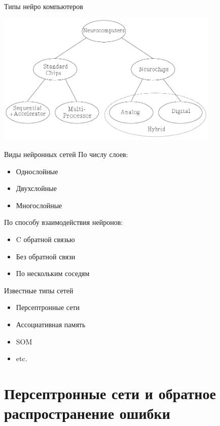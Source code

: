 \documentclass[14pt, fleqn, xcolor={dvipsnames, table}]{beamer}
\begin{document}
\begin{frame}{Типы нейро компьютеров}
\begin{center}
\includegraphics[width=0.8\textwidth]{neurocomp-types}
\end{center}
\end{frame}

\begin{frame}{Виды нейронных сетей}
По числу слоев:
\begin{itemize}
  \item Однослойные 
  \item Двухслойные
  \item Многослойные
\end{itemize}

По способу взаимодействия нейронов:
\begin{itemize}
  \item C обратной связью
  \item Без обратной связи
  \item По нескольким соседям
\end{itemize}
\end{frame}

\begin{frame}{Известные типы сетей}
\begin{itemize}
  \item Персептронные сети
  \item Ассоциативная память
  \item SOM
  \item etc.
\end{itemize}
\end{frame}

\section{Персептронные сети и обратное распространение ошибки}
\end{document}
